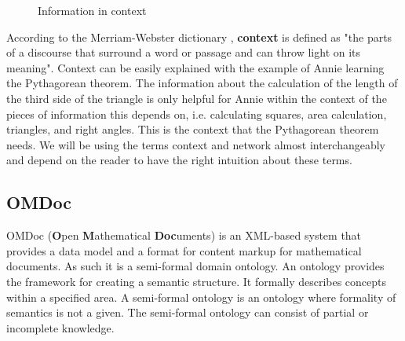 \documentclass[twoside, 12pt]{article}
\begin{document}
\begin{figure}
\vspace{-26pt}
  \begin{center}
  \end{center}
\vspace{-20pt}
  \caption{Information in context}
  \label{fig:Annie-context}
\vspace{-10pt}
\end{figure}

According to the Merriam-Webster dictionary \cite{Webster:npentrel14}, \textbf{context} is defined as "the parts of a discourse that surround a word or passage and can throw light on its meaning". Context can be easily explained with the example of Annie learning the Pythagorean theorem. The information about the calculation of the length of the third side of the triangle is only helpful for Annie within the context of the pieces of information this depends on, i.e. calculating squares, area calculation, triangles, and right angles. This is the context that the Pythagorean theorem needs. We will be using the terms context and network almost interchangeably and depend on the reader to have the right intuition about these terms.\\

\subsection{OMDoc}
\label{sec:OMDoc}

OMDoc (\textbf{O}pen \textbf{M}athematical \textbf{Doc}uments) \cite{Kohlhase:OMDoc1.2} is an XML-based system that provides a data model and a format for content markup for mathematical documents. As such it is a semi-formal domain ontology. An ontology provides the framework for creating a semantic structure. It formally describes concepts within a specified area. A semi-formal ontology \cite{Sheth:npentrel14} is an ontology where formality of semantics is not a given. The semi-formal ontology can consist of partial or incomplete knowledge. \\
\end{document}

